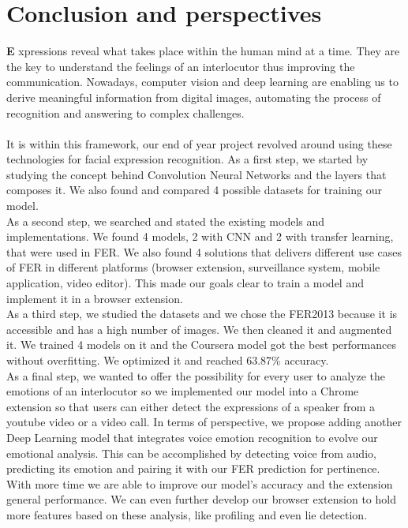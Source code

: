 \documentclass[12pt,a4paper,oneside,english]{book}
\begin{document}
\chapter*{\textbf{Conclusion and perspectives}}
\lettrine[findent=2pt]{\textbf{E}}{ }xpressions reveal what takes place within the human mind at a time. They are the key to understand the feelings of an interlocutor thus improving the communication.
Nowadays, computer vision and deep learning are enabling us to derive meaningful information from digital images, automating the process of recognition and answering to complex challenges.\\ \\
\indent It is within this framework, our end of year project revolved around using these technologies for facial expression recognition. As a first step, we started by studying the concept behind Convolution Neural Networks and the layers that composes it. We also found and compared 4 possible datasets for training our model. \\
\indent As a second step, we searched and stated the existing models and implementations. We found 4 models, 2 with CNN and 2 with transfer learning, that were used in FER. We also found 4 solutions that delivers different use cases of FER in different platforms (browser extension, surveillance system, mobile application, video editor). This made our goals clear to train a model and implement it in a browser extension.\\
\indent As a third step, we studied the datasets and we chose the FER2013 because it is accessible and has a high number of images. We then cleaned it and augmented it. We trained 4 models on it and the Coursera model got the best performances without overfitting. We optimized it and reached 63.87\% accuracy.\\
\indent As a final step, we wanted to offer the possibility for every user to analyze the emotions of an interlocutor so we implemented our model into a Chrome extension so that users can either detect the expressions of a speaker from a youtube video or a video call.
\newpage
\indent In terms of perspective, we propose adding another Deep Learning model that integrates voice emotion recognition to evolve our emotional analysis. This can be accomplished by detecting voice from audio, predicting its emotion and pairing it with our FER prediction for pertinence. With more time we are able to improve our model's accuracy and the extension general performance. We can even further develop our browser extension to hold more features based on these analysis, like profiling and even lie detection.

\begin{flushleft}
    
    
\end{flushleft}
\end{document}

